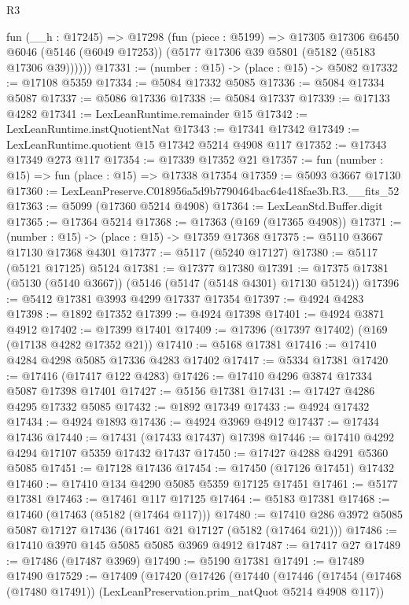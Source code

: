 \begin{lexlean}{R3}
\begin{coremodule}
      fun (__h : @17245) =>
      @17298
        (fun (piece : @5199) =>
        @17305
          @17306
          @6450
          @6046
          (@5146 (@6049 @17253))
          (@5177 @17306 @39 @5801 (@5182 (@5183 @17306 @39))))))
@17331 := (number : @15) -> (place : @15) -> @5082
@17332 := @17108 @5359
@17334 := @5084 @17332 @5085
@17336 := @5084 @17334 @5087
@17337 := @5086 @17336
@17338 := @5084 @17337
@17339 := @17133 @4282
@17341 := LexLeanRuntime.remainder @15
@17342 := LexLeanRuntime.instQuotientNat
@17343 := @17341 @17342
@17349 := LexLeanRuntime.quotient @15 @17342 @5214 @4908 @117
@17352 := @17343 @17349 @273 @117
@17354 := @17339 @17352 @21
@17357 := fun (number : @15) => fun (place : @15) => @17338 @17354
@17359 := @5093 @3667 @17130
@17360 := LexLeanPreserve.C018956a5d9b7790464bac64e418fae3b.R3.__fits_52
@17363 := @5099 (@17360 @5214 @4908)
@17364 := LexLeanStd.Buffer.digit
@17365 := @17364 @5214
@17368 := @17363 (@169 (@17365 @4908))
@17371 := (number : @15) -> (place : @15) -> @17359 @17368
@17375 := @5110 @3667 @17130 @17368 @4301
@17377 := @5117 (@5240 @17127)
@17380 := @5117 (@5121 @17125) @5124
@17381 := @17377 @17380
@17391 := @17375 @17381 (@5130 (@5140 @3667)) (@5146 (@5147 (@5148 @4301) @17130 @5124))
@17396 := @5412 @17381 @3993 @4299 @17337 @17354
@17397 := @4924 @4283
@17398 := @1892 @17352
@17399 := @4924 @17398
@17401 := @4924 @3871 @4912
@17402 := @17399 @17401
@17409 := @17396 (@17397 @17402) (@169 (@17138 @4282 @17352 @21))
@17410 := @5168 @17381
@17416 := @17410 @4284 @4298 @5085 @17336 @4283 @17402
@17417 := @5334 @17381
@17420 := @17416 (@17417 @122 @4283)
@17426 := @17410 @4296 @3874 @17334 @5087 @17398 @17401
@17427 := @5156 @17381
@17431 := @17427 @4286 @4295 @17332 @5085
@17432 := @1892 @17349
@17433 := @4924 @17432
@17434 := @4924 @1893
@17436 := @4924 @3969 @4912
@17437 := @17434 @17436
@17440 := @17431 (@17433 @17437) @17398
@17446 := @17410 @4292 @4294 @17107 @5359 @17432 @17437
@17450 := @17427 @4288 @4291 @5360 @5085
@17451 := @17128 @17436
@17454 := @17450 (@17126 @17451) @17432
@17460 := @17410 @134 @4290 @5085 @5359 @17125 @17451
@17461 := @5177 @17381
@17463 := @17461 @117 @17125
@17464 := @5183 @17381
@17468 := @17460 (@17463 (@5182 (@17464 @117)))
@17480 := @17410 @286 @3972 @5085 @5087 @17127 @17436 (@17461 @21 @17127 (@5182 (@17464 @21)))
@17486 := @17410 @3970 @145 @5085 @5085 @3969 @4912
@17487 := @17417 @27
@17489 := @17486 (@17487 @3969)
@17490 := @5190 @17381
@17491 := @17489 @17490
@17529 := @17409
    (@17420
      (@17426
        (@17440
          (@17446
            (@17454 (@17468 (@17480 @17491)) (LexLeanPreservation.prim_natQuot @5214 @4908 @117))

\end{coremodule}
\end{lexlean}
